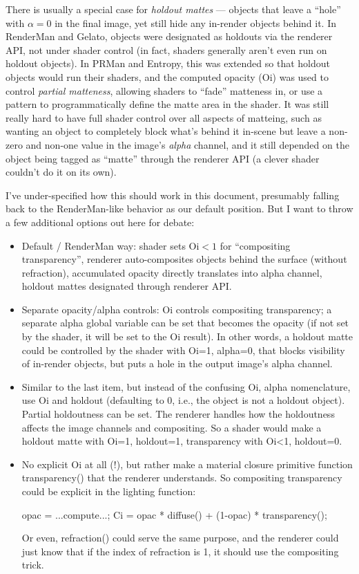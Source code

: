 \documentclass[11pt,letterpaper]{book}
\def\Oi{{\cf Oi}\xspace}
\begin{document}
\begin{annotate}
There is usually a special case for \emph{holdout mattes} --- objects
that leave a ``hole'' with $\alpha = 0$ in the final image, yet still
hide any in-render objects behind it.  In RenderMan and Gelato, objects
were designated as holdouts via the renderer API, not under shader
control (in fact, shaders generally aren't even run on holdout objects).
In PRMan and Entropy, this was extended so that holdout objects would
run their shaders, and the computed opacity (\Oi) was used to control
\emph{partial matteness}, allowing shaders to ``fade'' matteness in, or
use a pattern to programmatically define the matte area in the shader.
It was still really hard to have full shader control over all aspects of
matteing, such as wanting an object to completely block what's behind it
in-scene but leave a non-zero and non-one value in the image's
\emph{alpha} channel, and it still depended on the object being tagged
as ``matte'' through the renderer API (a clever shader couldn't do it on
its own).

I've under-specified how this should work in this document, presumably
falling back to the RenderMan-like behavior as our default position.
But I want to throw a few additional options out here for debate:

\begin{itemize}
\item Default / RenderMan way: shader sets \Oi $< 1$ for ``compositing
  transparency'', renderer auto-composites objects behind the surface
  (without refraction), accumulated opacity directly translates into
  alpha channel, holdout mattes designated through renderer API.
\item Separate opacity/alpha controls: \Oi controls compositing
  transparency; a separate {\cf alpha} global variable can be set that
  becomes the opacity (if not set by the shader, it will be set to the
  \Oi result).  In other words, a holdout matte could be controlled by
  the shader with {\cf Oi=1, alpha=0}, that blocks visibility of
  in-render objects, but puts a hole in the output image's alpha
  channel.
\item Similar to the last item, but instead of the confusing {\cf Oi,
  alpha} nomenclature, use {\cf Oi} and {\cf holdout} (defaulting to 0,
  i.e., the object is not a holdout object).  Partial holdoutness can be
  set.  The renderer handles how the holdoutness affects the image
  channels and compositing.  So a shader would make a holdout matte with
  {\cf Oi=1, holdout=1}, transparency with {\cf Oi<1, holdout=0}.
\item No explicit \Oi at all (!), but rather make a material closure
  primitive function {\cf transparency()} that the renderer understands.
  So compositing transparency could be explicit in the lighting
  function:
  \begin{code}
      opac = ...compute...;
      Ci = opac * diffuse() + (1-opac) * transparency();
  \end{code}
  Or even, {\cf refraction()} could serve the same purpose, and the
  renderer could just know that if the index of refraction is 1, it
  should use the compositing trick.  


\end{itemize}
\end{annotate}
\end{document}
